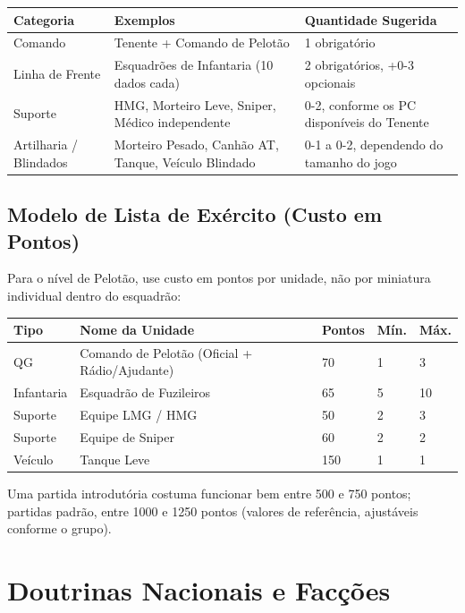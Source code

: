 \begin{center}
\begin{tabular}{p{2.6cm}p{5.2cm}p{4.6cm}}
\toprule
Categoria & Exemplos & Quantidade Sugerida \\
\midrule
Comando & Tenente + Comando de Pelotão & 1 obrigatório \\
Linha de Frente & Esquadrões de Infantaria (10 dados cada) & 2 obrigatórios, +0-3 opcionais \\
Suporte & HMG, Morteiro Leve, Sniper, Médico independente & 0-2, conforme os PC disponíveis do Tenente \\
Artilharia / Blindados & Morteiro Pesado, Canhão AT, Tanque, Veículo Blindado & 0-1 a 0-2, dependendo do tamanho do jogo \\
\bottomrule
\end{tabular}
\end{center}

\subsection{Modelo de Lista de Exército (Custo em Pontos)}
\label{sec:tabela-pontos}

Para o nível de Pelotão, use custo em pontos por unidade, não por miniatura individual dentro do esquadrão:

\begin{center}
\begin{tabular}{p{1.8cm}p{4.6cm}p{1.6cm}p{1.4cm}p{1.4cm}}
\toprule
Tipo & Nome da Unidade & Pontos & Mín. & Máx. \\
\midrule
QG & Comando de Pelotão (Oficial + Rádio/Ajudante) & 70 & 1 & 3 \\
Infantaria & Esquadrão de Fuzileiros & 65 & 5 & 10 \\
Suporte & Equipe LMG / HMG & 50 & 2 & 3 \\
Suporte & Equipe de Sniper & 60 & 2 & 2 \\
Veículo & Tanque Leve & 150 & 1 & 1 \\
\bottomrule
\end{tabular}
\end{center}

\begin{nota}
Uma partida introdutória costuma funcionar bem entre 500 e 750 pontos; partidas padrão, entre 1000 e 1250 pontos (valores de referência, ajustáveis conforme o grupo).
\end{nota}

\section{Doutrinas Nacionais e Facções}

